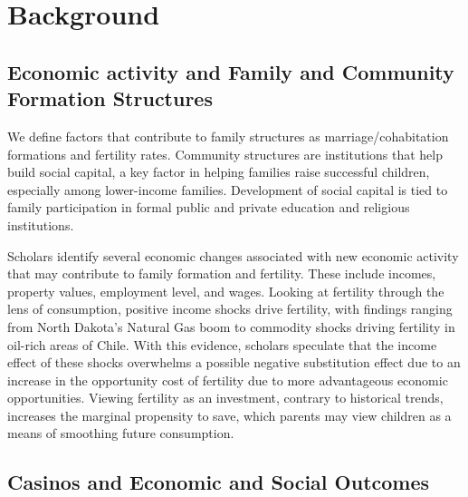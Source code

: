 \documentclass[12pt]{article}
\begin{document}
\section{Background}
\subsection{Economic activity and Family and Community Formation Structures}

We define factors that contribute to family structures as marriage/cohabitation formations and fertility rates. Community structures are institutions that help build social capital, a key factor in helping families raise successful children, especially among lower-income families. \parencite{chetty2026opportunity} Development of social capital is tied to family participation in formal public and private education and religious institutions. 

Scholars identify several economic changes associated with new economic activity that may contribute to family formation and fertility. These include incomes, property values, employment level, and wages. Looking at fertility through the lens of consumption, positive income shocks drive fertility, with findings ranging from North Dakota's Natural Gas boom  \parencite{kearney2018male} to commodity shocks driving fertility in oil-rich areas of Chile. \parencite{gallego2023baby} With this evidence, scholars speculate that the income effect of these shocks overwhelms a possible negative substitution effect due to an increase in the opportunity cost of fertility due to more advantageous economic opportunities. Viewing fertility as an investment, contrary to historical trends, increases the marginal propensity to save, which parents may view children as a means of smoothing future consumption. \parencite{goldin2021career,doepke2023economics}  



\subsection{Casinos and Economic and Social Outcomes}
\end{document}
